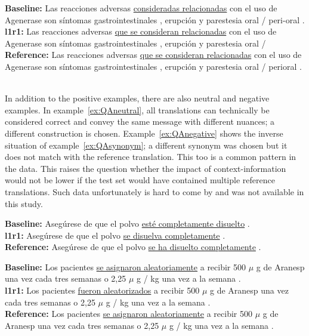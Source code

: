 \documentclass[smallextended]{svjour3}       %
\theoremstyle{break}
\begin{document}
\begin{exe}
\footnotesize
\ex \textbf{Baseline:} Las reacciones adversas \underline{consideradas relacionadas} con el uso de Agenerase son síntomas gastrointestinales , erupción y parestesia oral / peri-oral . \\
\textbf{l1r1:}  Las reacciones adversas \underline{que se consideran relacionadas} con el uso de Agenerase son síntomas gastrointestinales , erupción y parestesia oral / \\
\textbf{Reference:} Las reacciones adversas \underline{que se consideran relacionadas} con el uso de Agenerase son síntomas gastrointestinales , erupción y parestesia oral / perioral . \\ \\
\label{ex:QAgrammar}
\end{exe}

In addition to the positive examples, there are also neutral and negative
examples. In example~\ref{ex:QAneutral}, all translations can technically be
considered correct and convey the same message with different nuances; a
different construction is chosen. Example~\ref{ex:QAnegative} shows the
inverse situation of example~\ref{ex:QAsynonym}; a different synonym was chosen
but it does not match with the reference translation. This too is a common
pattern in the data. This raises the question whether the impact of
context-information would not be lower if the test set would have contained
multiple reference translations. Such data unfortunately is hard to come by and
was not available in this study.

\begin{exe}
\footnotesize
\ex \textbf{Baseline:} Asegúrese de que el polvo \underline{esté completamente disuelto} . \\
\textbf{l1r1:} Asegúrese de que el polvo \underline{se disuelva completamente} .  \\
\textbf{Reference:} Asegúrese de que el polvo \underline{se ha disuelto completamente} .
\label{ex:QAneutral}
\end{exe}

\begin{exe}
\footnotesize
\ex \textbf{Baseline:} Los pacientes \underline{se asignaron aleatoriamente} a recibir 500 $\mu$ g de Aranesp una vez cada tres semanas o 2,25 $\mu$ g / kg una vez a la semana . \\
\textbf{l1r1:} Los pacientes \underline{fueron aleatorizados} a recibir 500 $\mu$ g de Aranesp una vez cada tres semanas o 2,25 $\mu$ g / kg una vez a la semana . \\
\textbf{Reference:} Los pacientes \underline{se asignaron aleatoriamente} a recibir 500 $\mu$ g de Aranesp una vez cada tres semanas o 2,25 $\mu$ g / kg una vez a la semana .
\label{ex:QAnegative}
\end{exe}
\end{document}
